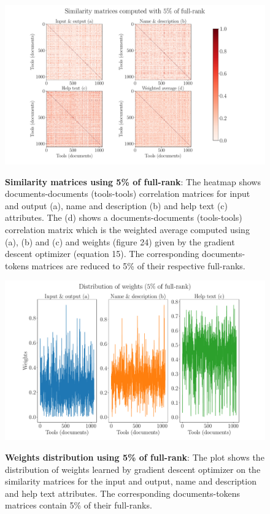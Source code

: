 \begin{figure}[h]
\begin{centering}
    {\includegraphics[scale=0.35]{figures/Similarity_matrices_005.pdf}}
    \caption[Similarity matrices 5\% rank]{\textbf{Similarity matrices using 5\% of full-rank}: The heatmap shows documents-documents (tools-tools) correlation matrices for input and output (a), name and description (b) and help text (c) attributes. The (d) shows a documents-documents (tools-tools) correlation matrix which is the weighted average computed using (a), (b) and (c) and weights (figure 24) given by the gradient descent optimizer (equation 15). The corresponding documents-tokens matrices are reduced to 5\% of their respective full-ranks.}
\end{centering}
\end{figure}

\begin{figure}[h]
\begin{centering}
    {\includegraphics[scale=0.35]{figures/Weights_005.pdf}}
    \caption[Weights distribution 5\% rank]{\textbf{Weights distribution using 5\% of full-rank}: The plot shows the distribution of weights learned by gradient descent optimizer on the similarity matrices for the input and output, name and description and help text attributes. The corresponding documents-tokens matrices contain 5\% of their full-ranks.}
\end{centering}
\end{figure}

